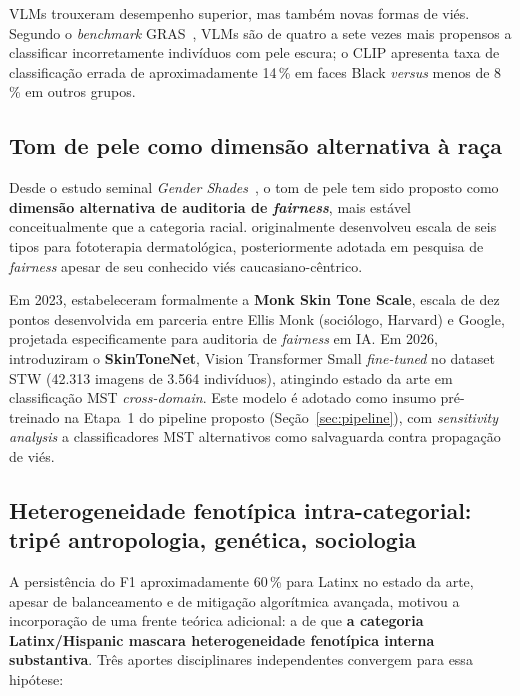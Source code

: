 VLMs trouxeram desempenho superior, mas também novas formas de viés. Segundo o \emph{benchmark} GRAS~\autocite{malik2025ask}, VLMs são de quatro a sete vezes mais propensos a classificar incorretamente indivíduos com pele escura; o CLIP apresenta taxa de classificação errada de aproximadamente 14\,\% em faces Black \emph{versus} menos de 8\,\% em outros grupos.

\subsection{Tom de pele como dimensão alternativa à raça}
\label{sec:rl_skintone}

Desde o estudo seminal \emph{Gender Shades}~\autocite{buolamwini2018gender}, o tom de pele tem sido proposto como \textbf{dimensão alternativa de auditoria de \emph{fairness}}, mais estável conceitualmente que a categoria racial. \textcite{fitzpatrick1988validity} originalmente desenvolveu escala de seis tipos para fototerapia dermatológica, posteriormente adotada em pesquisa de \emph{fairness} apesar de seu conhecido viés caucasiano-cêntrico.

Em 2023, \textcite{schumann2023consensus} estabeleceram formalmente a \textbf{Monk Skin Tone Scale}, escala de dez pontos desenvolvida em parceria entre Ellis Monk (sociólogo, Harvard) e Google, projetada especificamente para auditoria de \emph{fairness} em IA. Em 2026, \textcite{matias2026large} introduziram o \textbf{SkinToneNet}, Vision Transformer Small \emph{fine-tuned} no dataset STW (42.313 imagens de 3.564 indivíduos), atingindo estado da arte em classificação MST \emph{cross-domain}. Este modelo é adotado como insumo pré-treinado na Etapa~1 do pipeline proposto (Seção~\ref{sec:pipeline}), com \emph{sensitivity analysis} a classificadores MST alternativos como salvaguarda contra propagação de viés.

\subsection{Heterogeneidade fenotípica intra-categorial: tripé antropologia, genética, sociologia}
\label{sec:rl_latinx}

A persistência do F1 aproximadamente 60\,\% para Latinx no estado da arte, apesar de balanceamento e de mitigação algorítmica avançada, motivou a incorporação de uma frente teórica adicional: a de que \textbf{a categoria Latinx/Hispanic mascara heterogeneidade fenotípica interna substantiva}. Três aportes disciplinares independentes convergem para essa hipótese:

